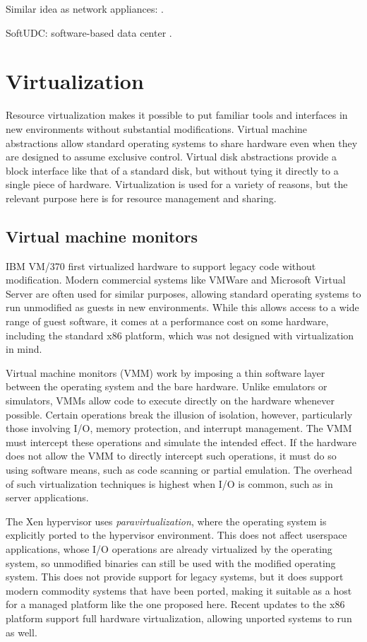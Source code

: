 Similar idea as network appliances: \cite{sapuntzakis03}.

SoftUDC: software-based data center \cite{kallahalla}.

\section{Virtualization}

Resource virtualization makes it possible to put familiar tools and interfaces in new environments without substantial modifications. Virtual machine abstractions allow standard operating systems to share hardware even when they are designed to assume exclusive control. Virtual disk abstractions provide a block interface like that of a standard disk, but without tying it directly to a single piece of hardware. Virtualization is used for a variety of reasons, but the relevant purpose here is for resource management and sharing.

\subsection{Virtual machine monitors}

IBM VM/370 \cite{gum} first virtualized hardware to support legacy code without modification. Modern commercial systems like VMWare \cite{vmware} and Microsoft Virtual Server \cite{microsoftvm} are often used for similar purposes, allowing standard operating systems to run unmodified as guests in new environments. While this allows access to a wide range of guest software, it comes at a performance cost on some hardware, including the standard x86 platform, which was not designed with virtualization in mind.

Virtual machine monitors (VMM) work by imposing a thin software layer between the operating system and the bare hardware. Unlike emulators or simulators, VMMs allow code to execute directly on the hardware whenever possible. Certain operations break the illusion of isolation, however, particularly those involving I/O, memory protection, and interrupt management. The VMM must intercept these operations and simulate the intended effect. If the hardware does not allow the VMM to directly intercept such operations, it must do so using software means, such as code scanning or partial emulation. The overhead of such virtualization techniques is highest when I/O is common, such as in server applications.

The Xen hypervisor \cite{barham} uses \emph{paravirtualization}, where the operating system is explicitly ported to the hypervisor environment. This does not affect userspace applications, whose I/O operations are already virtualized by the operating system, so unmodified binaries can still be used with the modified operating system. This does not provide support for legacy systems, but it does support modern commodity systems that have been ported, making it suitable as a host for a managed platform like the one proposed here. Recent updates to the x86 platform support full hardware virtualization, allowing unported systems to run as well.

